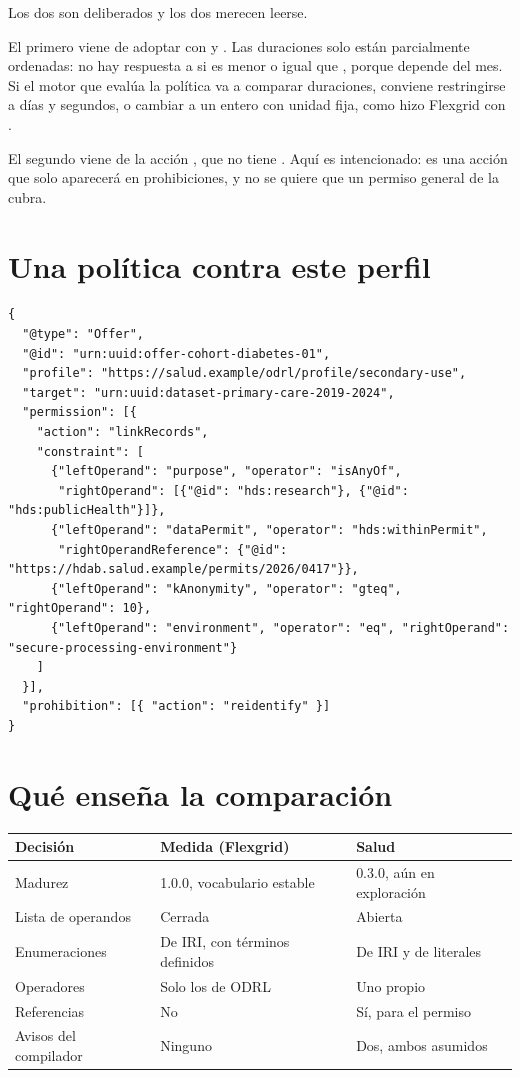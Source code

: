 Los dos son deliberados y los dos merecen leerse.

El primero viene de adoptar  con  y . Las duraciones solo
están parcialmente ordenadas: no hay respuesta a si  es menor o igual que , porque depende del
mes. Si el motor que evalúa la política va a comparar duraciones, conviene restringirse a días y segundos, o
cambiar a un entero con unidad fija, como hizo Flexgrid con .

El segundo viene de la acción , que no tiene . Aquí es intencionado: es una
acción que solo aparecerá en prohibiciones, y no se quiere que un permiso general de  la cubra.

\section{Una política contra este perfil}

\begin{lstlisting}[style=json]
{
  "@type": "Offer",
  "@id": "urn:uuid:offer-cohort-diabetes-01",
  "profile": "https://salud.example/odrl/profile/secondary-use",
  "target": "urn:uuid:dataset-primary-care-2019-2024",
  "permission": [{
    "action": "linkRecords",
    "constraint": [
      {"leftOperand": "purpose", "operator": "isAnyOf",
       "rightOperand": [{"@id": "hds:research"}, {"@id": "hds:publicHealth"}]},
      {"leftOperand": "dataPermit", "operator": "hds:withinPermit",
       "rightOperandReference": {"@id": "https://hdab.salud.example/permits/2026/0417"}},
      {"leftOperand": "kAnonymity", "operator": "gteq", "rightOperand": 10},
      {"leftOperand": "environment", "operator": "eq", "rightOperand": "secure-processing-environment"}
    ]
  }],
  "prohibition": [{ "action": "reidentify" }]
}
\end{lstlisting}

\section{Qué enseña la comparación}

\noindent\begin{tabularx}{\linewidth}{@{}L{4.2cm}Y Y@{}}
\toprule
\textbf{Decisión} & \textbf{Medida (Flexgrid)} & \textbf{Salud} \\
\midrule
Madurez & 1.0.0, vocabulario estable & 0.3.0, aún en exploración \\
Lista de operandos & Cerrada & Abierta \\
Enumeraciones & De IRI, con términos definidos & De IRI y de literales \\
Operadores & Solo los de ODRL & Uno propio \\
Referencias & No & Sí, para el permiso \\
Avisos del compilador & Ninguno & Dos, ambos asumidos \\
\bottomrule
\end{tabularx}

